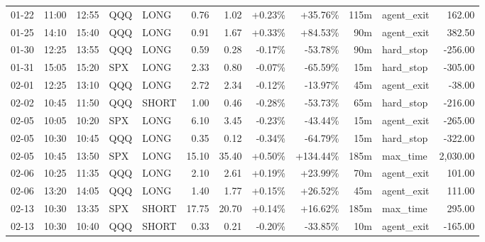 \documentclass[11pt,a4paper,twoside]{article}
\begin{document}
\begin{center}
\begin{longtable}{>{\color{txtmain}}l l l l l r r r r r >{\color{txtmain}}l r}
01-22 & 11:00 & 12:55 & QQQ & LONG & 0.76 & 1.02 & \textcolor{wingreen}{+0.23\%} & \textcolor{wingreen}{+35.76\%} & 115m & agent\_exit & \textcolor{wingreen}{162.00} \\
01-25 & 14:10 & 15:40 & QQQ & LONG & 0.91 & 1.67 & \textcolor{wingreen}{+0.33\%} & \textcolor{wingreen}{+84.53\%} & 90m & agent\_exit & \textcolor{wingreen}{382.50} \\
01-30 & 12:25 & 13:55 & QQQ & LONG & 0.59 & 0.28 & \textcolor{lossred}{-0.17\%} & \textcolor{lossred}{-53.78\%} & 90m & hard\_stop & \textcolor{lossred}{-256.00} \\
01-31 & 15:05 & 15:20 & SPX & LONG & 2.33 & 0.80 & \textcolor{lossred}{-0.07\%} & \textcolor{lossred}{-65.59\%} & 15m & hard\_stop & \textcolor{lossred}{-305.00} \\
02-01 & 12:25 & 13:10 & QQQ & LONG & 2.72 & 2.34 & \textcolor{lossred}{-0.12\%} & \textcolor{lossred}{-13.97\%} & 45m & agent\_exit & \textcolor{lossred}{-38.00} \\
02-02 & 10:45 & 11:50 & QQQ & SHORT & 1.00 & 0.46 & \textcolor{lossred}{-0.28\%} & \textcolor{lossred}{-53.73\%} & 65m & hard\_stop & \textcolor{lossred}{-216.00} \\
02-05 & 10:05 & 10:20 & SPX & LONG & 6.10 & 3.45 & \textcolor{lossred}{-0.23\%} & \textcolor{lossred}{-43.44\%} & 15m & agent\_exit & \textcolor{lossred}{-265.00} \\
02-05 & 10:30 & 10:45 & QQQ & LONG & 0.35 & 0.12 & \textcolor{lossred}{-0.34\%} & \textcolor{lossred}{-64.79\%} & 15m & hard\_stop & \textcolor{lossred}{-322.00} \\
02-05 & 10:45 & 13:50 & SPX & LONG & 15.10 & 35.40 & \textcolor{wingreen}{+0.50\%} & \textcolor{wingreen}{+134.44\%} & 185m & max\_time & \textcolor{wingreen}{2,030.00} \\
02-06 & 10:25 & 11:35 & QQQ & LONG & 2.10 & 2.61 & \textcolor{wingreen}{+0.19\%} & \textcolor{wingreen}{+23.99\%} & 70m & agent\_exit & \textcolor{wingreen}{101.00} \\
02-06 & 13:20 & 14:05 & QQQ & LONG & 1.40 & 1.77 & \textcolor{wingreen}{+0.15\%} & \textcolor{wingreen}{+26.52\%} & 45m & agent\_exit & \textcolor{wingreen}{111.00} \\
02-13 & 10:30 & 13:35 & SPX & SHORT & 17.75 & 20.70 & \textcolor{wingreen}{+0.14\%} & \textcolor{wingreen}{+16.62\%} & 185m & max\_time & \textcolor{wingreen}{295.00} \\
02-13 & 10:30 & 10:40 & QQQ & SHORT & 0.33 & 0.21 & \textcolor{lossred}{-0.20\%} & \textcolor{lossred}{-33.85\%} & 10m & agent\_exit & \textcolor{lossred}{-165.00} \\

\end{longtable}
\end{center}
\end{document}
